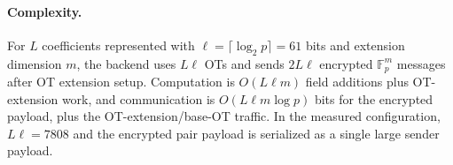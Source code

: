 \paragraph{Complexity.}
For \(L\) coefficients represented with \(\ell=\lceil\log_2 p\rceil=61\) bits and extension dimension \(m\), the backend uses \(L\ell\) OTs and sends \(2L\ell\) encrypted \(\mathbb{F}_p^m\) messages after OT extension setup. Computation is \(O(L\ell m)\) field additions plus OT-extension work, and communication is \(O(L\ell m\log p)\) bits for the encrypted payload, plus the OT-extension/base-OT traffic. In the measured configuration, \(L\ell=7808\) and the encrypted pair payload is serialized as a single large sender payload.
